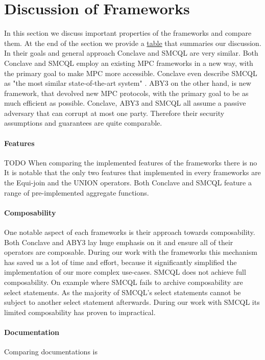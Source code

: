 \section{Discussion of Frameworks}
In this section we discuss important properties of the frameworks and compare them. 
At the end of the section we provide a \hyperref[Summary]{table} that summaries our discussion.
In their goals and general approach Conclave and SMCQL are very similar. Both Conclave and SMCQL employ an existing MPC frameworks in a new way, with the primary goal to make MPC more accessible. Conclave even describe SMCQL as "the most similar state-of-the-art system" \cite{10.1145/3302424.3303982}. ABY3 on the other hand, is new framework, that devolved new MPC protocols, with the primary goal to be as much efficient as possible. 
Conclave, ABY3 and SMCQL all assume a passive adversary that can corrupt at most one party. Therefore their security assumptions and guarantees are quite comparable. 
\paragraph{Features} TODO
When comparing the implemented features of the frameworks there is no 
It is notable that the only two features that implemented in every frameworks are the Equi-join and the UNION operators. 
Both Conclave and SMCQL feature a range of pre-implemented aggregate functions.  
\paragraph{Composability}
One notable aspect of each frameworks is their approach towards composability. Both Conclave and ABY3 lay huge emphasis on it and ensure all of their operators are composable. During our work with the frameworks this mechanism has saved us a lot of time and effort, because it significantly simplified the implementation of our more complex use-cases.
SMCQL does not achieve full composability. On example where SMCQL fails to archive composability are select statements. As the majority of SMCQL's select statements cannot be subject to another select statement afterwards. During our work with SMCQL its limited composability has proven to impractical. 
\paragraph{Documentation}
Comparing documentations is 
